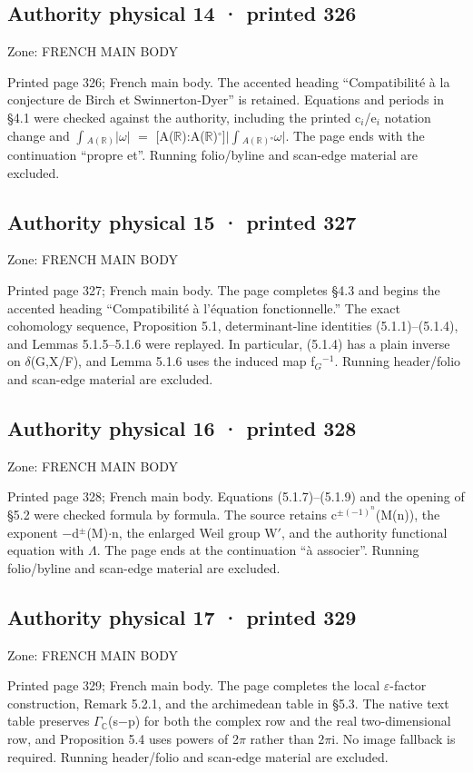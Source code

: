 \documentclass[10pt,twoside]{article}
\begin{document}
\subsection*{Authority physical 14 · printed 326}
\noindent\textsf{Zone: FRENCH MAIN BODY}\par
Printed page 326; French main body. The accented heading “Compatibilité à la conjecture de Birch et Swinnerton-Dyer” is retained. Equations and periods in \S{}4.1 were checked against the authority, including the printed c\ensuremath{_{i}}/e\ensuremath{_{i}} notation change and \ensuremath{∫}\ensuremath{_{A(ℝ)}}\ensuremath{|}\ensuremath{ω}\ensuremath{|} \ensuremath{=} [A(\ensuremath{ℝ}):A(\ensuremath{ℝ})\ensuremath{^{\circ}}]\ensuremath{|}\ensuremath{∫}\ensuremath{_{A(ℝ)°}}\ensuremath{ω}\ensuremath{|}. The page ends with the continuation “propre et”. Running folio/byline and scan-edge material are excluded.\par
\subsection*{Authority physical 15 · printed 327}
\noindent\textsf{Zone: FRENCH MAIN BODY}\par
Printed page 327; French main body. The page completes \S{}4.3 and begins the accented heading “Compatibilité à l’équation fonctionnelle.” The exact cohomology sequence, Proposition 5.1, determinant-line identities (5.1.1)–(5.1.4), and Lemmas 5.1.5–5.1.6 were replayed. In particular, (5.1.4) has a plain inverse on \ensuremath{δ}(G,X/F), and Lemma 5.1.6 uses the induced map f\ensuremath{_{G}}\ensuremath{^{-1}}. Running header/folio and scan-edge material are excluded.\par
\subsection*{Authority physical 16 · printed 328}
\noindent\textsf{Zone: FRENCH MAIN BODY}\par
Printed page 328; French main body. Equations (5.1.7)–(5.1.9) and the opening of \S{}5.2 were checked formula by formula. The source retains c\ensuremath{^{±(−1)^n}}(M(n)), the exponent \ensuremath{−}d\ensuremath{^{±}}(M)\ensuremath{·}n, the enlarged Weil group W\ensuremath{′}, and the authority functional equation with \ensuremath{Λ}. The page ends at the continuation “à associer”. Running folio/byline and scan-edge material are excluded.\par
\subsection*{Authority physical 17 · printed 329}
\noindent\textsf{Zone: FRENCH MAIN BODY}\par
Printed page 329; French main body. The page completes the local \ensuremath{ε}-factor construction, Remark 5.2.1, and the archimedean table in \S{}5.3. The native text table preserves \ensuremath{Γ}\ensuremath{_{ℂ}}(s\ensuremath{−}p) for both the complex row and the real two-dimensional row, and Proposition 5.4 uses powers of 2\ensuremath{π} rather than 2\ensuremath{π}i. No image fallback is required. Running header/folio and scan-edge material are excluded.\par
\end{document}
